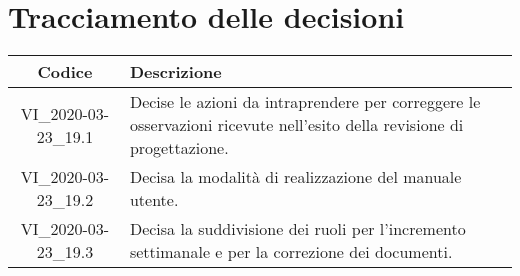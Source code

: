 \section*{Tracciamento delle decisioni}

\begin{center}
	\begin{longtable}{|c|p{12.25cm}|}
		\hline
		\rowcolor{lighter-grayer}
		\textbf{Codice} & \textbf{Descrizione} \\
		\hline
		\endfirsthead
		
		\hline
		VI\_2020-03-23\_19.1 & Decise le azioni da intraprendere per correggere le osservazioni ricevute nell'esito della revisione di progettazione. \\
		\hline
		VI\_2020-03-23\_19.2 & Decisa la modalità di realizzazione del manuale utente. \\
		\hline
		VI\_2020-03-23\_19.3 & Decisa la suddivisione dei ruoli per l'incremento settimanale e per la correzione dei documenti. \\
		\hline
		
	\end{longtable}
\end{center}
